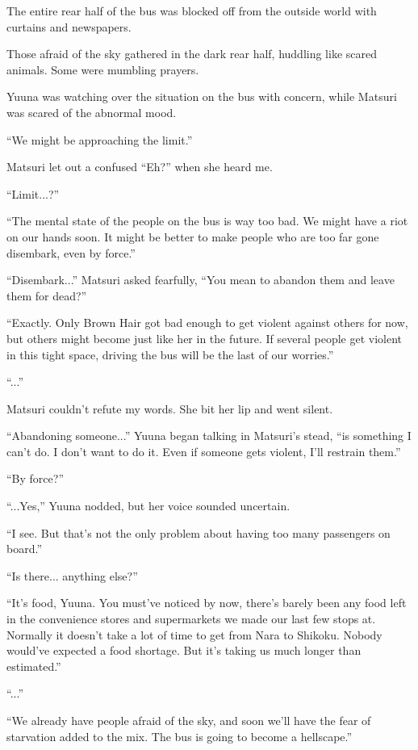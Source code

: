 The entire rear half of the bus was blocked off from the outside world with curtains and newspapers.

Those afraid of the sky gathered in the dark rear half, huddling like scared animals. Some were mumbling prayers.

Yuuna was watching over the situation on the bus with concern, while Matsuri was scared of the abnormal mood.

``We might be approaching the limit.''

Matsuri let out a confused ``Eh?'' when she heard me.

``Limit...?''

``The mental state of the people on the bus is way too bad. We might have a riot on our hands soon. It might be better to make people who are too far gone disembark, even by force.''

``Disembark...'' Matsuri asked fearfully, ``You mean to abandon them and leave them for dead?''

``Exactly. Only Brown Hair got bad enough to get violent against others for now, but others might become just like her in the future. If several people get violent in this tight space, driving the bus will be the last of our worries.''

``...''

Matsuri couldn't refute my words. She bit her lip and went silent.

``Abandoning someone...'' Yuuna began talking in Matsuri's stead, ``is something I can't do. I don't want to do it. Even if someone gets violent, I'll restrain them.''

``By force?''

``...Yes,'' Yuuna nodded, but her voice sounded uncertain.

``I see. But that's not the only problem about having too many passengers on board.''

``Is there... anything else?''

``It's food, Yuuna. You must've noticed by now, there's barely been any food left in the convenience stores and supermarkets we made our last few stops at. Normally it doesn't take a lot of time to get from Nara to Shikoku. Nobody would've expected a food shortage. But it's taking us much longer than estimated.''

``...''

``We already have people afraid of the sky, and soon we'll have the fear of starvation added to the mix. The bus is going to become a hellscape.''


